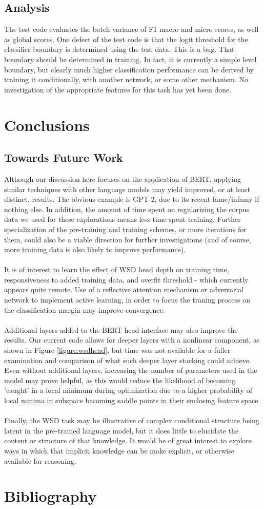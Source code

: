 \documentclass{IEEEtran}
\begin{document}
\subsection{Analysis}
	The test code evaluates the batch variance of F1 macro and micro scores, as well as global scores.  One defect of the test code is that the logit threshold for the classifier boundary is determined using the test data.  This is a bug.  That boundary should be determined in training.  In fact, it is currently a simple level boundary, but clearly much higher classification performance can be derived by training it conditionally, with another network, or some other mechanism.  No investigation of the appropriate features for this task has yet been done.
\section{Conclusions}


\subsection{Towards Future Work}
	Although our discussion here focuses on the application of BERT, applying similar techniques with other language models may yield improved, or at least distinct, results. The obvious example is GPT-2, due to its recent fame/infamy if nothing else. In addition, the amount of time spent on regularizing the corpus data we used for these explorations means less time spent training. Further specialization of the pre-training and training schemes, or more iterations for them, could also be a viable direction for further investigations (and of course, more training data is also likely to improve performance).
	\\ \\
	It is of interest to learn the effect of WSD head depth on training time, responsiveness to added training data, and overfit threshold - which currently appears quite remote.  Use of a reflective attention mechanism or adversarial network to implement active learning, in order to focus the traning process on the classification margin may improve convergence.
	\\ \\
	Additional layers added to the BERT head interface may also improve the results. Our current code allows for deeper layers with a nonlinear component, as shown in Figure \ref{figure:wsdhead}, but time was not available for a fuller examination and comparison of what such deeper layer stacking could achieve. Even without additional layers, increasing the number of parameters used in the model may prove helpful, as this would reduce the likelihood of becoming 'caught' in a local minimum during optimization due to a higher probability of local minima in subspace becoming saddle points in their enclosing feature space.
	\\ \\
	Finally, the WSD task may be illustrative of complex conditional structure being latent in the pre-trained language model, but it does little to elucidate the content or structure of that knowledge.  It would be of great interest to explore ways in which that implicit knowledge can be make explicit, or otherwise available for reasoning.
\section{Bibliography}


\end{document}
